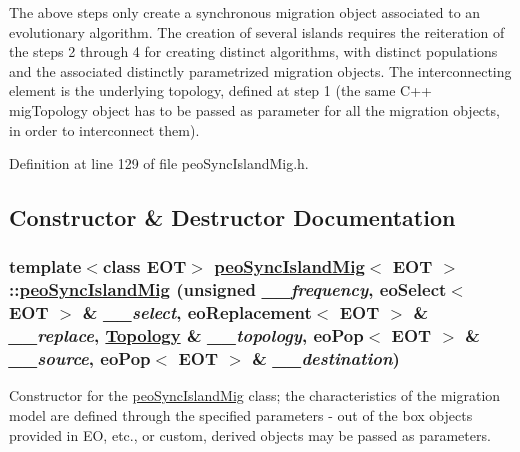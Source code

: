The above steps only create a synchronous migration object associated to an evolutionary algorithm. The creation of several islands requires the reiteration of the steps 2 through 4 for creating distinct algorithms, with distinct populations and the associated distinctly parametrized migration objects. The interconnecting element is the underlying topology, defined at step 1 (the same C++ mig\-Topology object has to be passed as parameter for all the migration objects, in order to interconnect them). 



Definition at line 129 of file peo\-Sync\-Island\-Mig.h.

\subsection{Constructor \& Destructor Documentation}
\hypertarget{classpeoSyncIslandMig_96b7b6de20b5e318a8b1cde76842305c}{
\subsubsection[peoSyncIslandMig]{\setlength{\rightskip}{0pt plus 5cm}template$<$class EOT$>$ \hyperlink{classpeoSyncIslandMig}{peo\-Sync\-Island\-Mig}$<$ EOT $>$::\hyperlink{classpeoSyncIslandMig}{peo\-Sync\-Island\-Mig} (unsigned {\em \_\-\_\-frequency}, eo\-Select$<$ EOT $>$ \& {\em \_\-\_\-select}, eo\-Replacement$<$ EOT $>$ \& {\em \_\-\_\-replace}, \hyperlink{classTopology}{Topology} \& {\em \_\-\_\-topology}, eo\-Pop$<$ EOT $>$ \& {\em \_\-\_\-source}, eo\-Pop$<$ EOT $>$ \& {\em \_\-\_\-destination})}}
\label{classpeoSyncIslandMig_96b7b6de20b5e318a8b1cde76842305c}


Constructor for the \hyperlink{classpeoSyncIslandMig}{peo\-Sync\-Island\-Mig} class; the characteristics of the migration model are defined through the specified parameters - out of the box objects provided in EO, etc., or custom, derived objects may be passed as parameters. 


